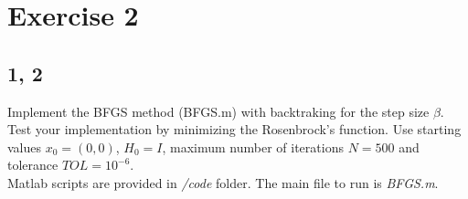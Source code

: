 \documentclass[unicode,11pt,a4paper,oneside,numbers=endperiod,openany]{scrartcl}
\newcommand{\myvec}[1]{\begin{bmatrix} #1 \end{bmatrix}}
\begin{document}



\section*{Exercise 2}


\subsection*{1, 2}
Implement the BFGS method (BFGS.m) with backtraking for the step size $\beta$. 
Test your implementation by minimizing the Rosenbrock's function. 
Use starting values $x_0 = (0, 0)$, 
$H_0 = I$, 
maximum number of iterations $N = 500$ and tolerance $TOL = 10^{-6}$.
\\\newline
Matlab scripts are provided in \textit{/code} folder.
The main file to run is \textit{BFGS.m}.
\end{document}
